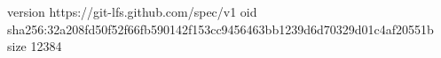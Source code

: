 version https://git-lfs.github.com/spec/v1
oid sha256:32a208fd50f52f66fb590142f153cc9456463bb1239d6d70329d01c4af20551b
size 12384

